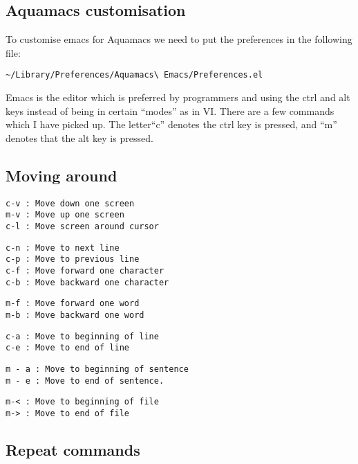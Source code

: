 \documentclass[a4paper, 10pt]{article}
\begin{document}
\subsection*{Aquamacs customisation}
\label{sec:ubuntu-customisation}

To customise emacs for Aquamacs we need to put the preferences in the
following file:
\begin{verbatim}
~/Library/Preferences/Aquamacs\ Emacs/Preferences.el
\end{verbatim}

Emacs is the editor which is preferred by programmers and using the ctrl and alt keys instead of being in certain ``modes'' as in VI. There are a few commands which I have picked up. The letter``c'' denotes the ctrl key is pressed, and ``m'' denotes that the alt key is pressed.

\subsection*{Moving around}
\begin{verbatim}
c-v : Move down one screen
m-v : Move up one screen
c-l : Move screen around cursor
 \end{verbatim}
 
 \begin{verbatim}
c-n : Move to next line
c-p : Move to previous line
c-f : Move forward one character
c-b : Move backward one character
 \end{verbatim}
 
 \begin{verbatim}
m-f : Move forward one word
m-b : Move backward one word
 \end{verbatim}
 
  \begin{verbatim}
c-a : Move to beginning of line
c-e : Move to end of line
 \end{verbatim}
 
  \begin{verbatim}
m - a : Move to beginning of sentence
m - e : Move to end of sentence.
 \end{verbatim}
 
  \begin{verbatim}
m-< : Move to beginning of file
m-> : Move to end of file
 \end{verbatim}
 
 \subsection*{Repeat commands}
 
\end{document}
